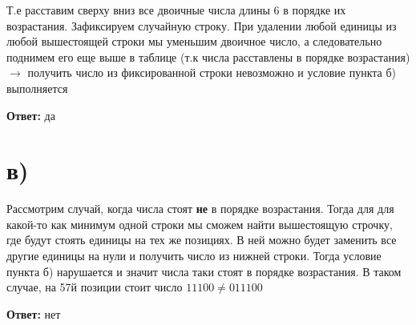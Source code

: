 \documentclass[a4paper,12pt]{article}
\begin{document}
Т.е расставим сверху вниз все двоичные числа длины 6 в порядке их возрастания. Зафиксируем случайную строку. При удалении любой единицы из любой вышестоящей строки мы уменьшим двоичное число, а следовательно поднимем его еще выше в таблице (т.к числа расставлены в порядке возрастания) $\rightarrow$ получить число из фиксированной строки невозможно и условие пункта б) выполняется
\begin{center}
\textbf{Ответ:} да
\end{center}
\section*{в)}
Рассмотрим случай, когда числа стоят \textbf{не} в порядке возрастания. Тогда для для какой-то как минимум одной строки мы сможем найти вышестоящую строчку, где будут стоять единицы на тех же позициях. В ней можно будет заменить все другие единицы на нули и получить число из нижней строки. Тогда условие пункта б) нарушается и значит числа таки стоят в порядке возрастания. В таком случае, на 57й позиции стоит число  $11100 \neq 011100$
\begin{center}
\textbf{Ответ:} нет
\end{center}
\end{document}
